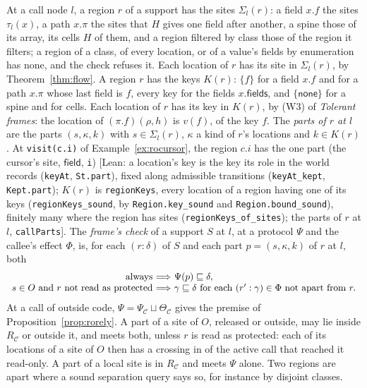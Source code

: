 \documentclass[10pt,a4paper]{article}
\theoremstyle{definition}
\theoremstyle{remark}
\newcommand{\kw}[1]{\mathsf{#1}}
\newcommand{\code}[1]{\texttt{#1}}
\newcommand{\kF}{\mathsf{field}}\newcommand{\kC}{\mathsf{cell}}\newcommand{\kE}{\mathsf{elem}}\newcommand{\kS}{\mathsf{spine}}\newcommand{\kI}{\mathsf{id}}
\newcommand{\lean}[1]{\texttt{\small #1}}
\newcommand{\status}[1]{\textsf{\small[#1]}}
\newcommand{\cC}{\mathcal{C}}
\begin{document}
\noindent
At a call node $l$, a region $r$ of a support has the sites
$\Sigma_l(r)$: a field $x.f$ the sites $\tau_l(x)$, a path $x.\pi$ the
sites that $H$ gives one field after another, a spine those of its array,
its cells $H$ of them, and a region filtered by class those of the region
it filters; a region of a class, of every location, or of a value's
fields by enumeration has none, and the check refuses it. Each location
of $r$ has its site in $\Sigma_l(r)$, by Theorem~\ref{thm:flow}. A region
$r$ has the keys $K(r)$: $\{f\}$ for a field $x.f$ and for a path $x.\pi$
whose last field is $f$, every key for the fields $x.\kw{fields}$, and
$\{\kw{none}\}$ for a spine and for cells. Each location of $r$ has its
key in $K(r)$, by (W3) of \emph{Tolerant frames}: the location of
$(\pi.f)(\rho,h)$ is $v(f)$, of the key $f$. The \emph{parts of $r$ at
$l$} are the parts $(s,\kappa,k)$ with $s\in\Sigma_l(r)$, $\kappa$ a kind
of $r$'s locations and $k\in K(r)$. At \code{visit(c.i)} of
Example~\ref{ex:rocursor}, the region $c.i$ has the one part (the
cursor's site, $\kF$, \code{i})
\status{Lean: a location's key is the key its role in the world records (\lean{keyAt}, \lean{St.part}), fixed along admissible transitions (\lean{keyAt\_kept}, \lean{Kept.part}); $K(r)$ is \lean{regionKeys}, every location of a region having one of its keys (\lean{regionKeys\_sound}, by \lean{Region.key\_sound} and \lean{Region.bound\_sound}), finitely many where the region has sites (\lean{regionKeys\_of\_sites}); the parts of $r$ at $l$, \lean{callParts}}.
The \emph{frame's check} of a support $S$ at $l$, at a
protocol $\Psi$ and the callee's effect $\Phi$, is, for each $(r:\delta)$
of $S$ and each part $p=(s,\kappa,k)$ of $r$ at $l$, both
\[
\begin{array}{r@{\ \Longrightarrow\ }l}
\text{always} & \Psi(p)\sqsubseteq\delta,\\
s\in O\text{ and }r\text{ not read as protected} & \gamma\sqsubseteq\delta\ \text{for each}\ (r':\gamma)\in\Phi\ \text{not apart from}\ r.
\end{array}
\]
At a call of outside code, $\Psi=\Psi_\cC\sqcup\Theta_\cC$ gives the
premise of Proposition~\ref{prop:rorely}. A part of a site of $O$,
released or outside, may lie inside $R_\cC$ or outside it, and meets
both, unless $r$ is read as protected: each of its locations of a site of
$O$ then has a crossing in of the active call that reached it read-only.
A part of a local site is in $R_\cC$ and meets $\Psi$ alone. Two regions
are apart where a sound separation query says so, for instance by
disjoint classes.
\end{document}

